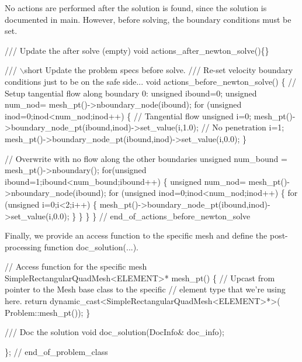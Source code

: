 No actions are performed after the solution is found, since the solution is documented in {\ttfamily main}. However, before solving, the boundary conditions must be set.


\begin{DoxyCodeInclude}
 \textcolor{comment}{/// Update the after solve (empty)}
 \textcolor{keywordtype}{void} actions\_after\_newton\_solve()\{\}

\textcolor{comment}{}
\textcolor{comment}{ /// \(\backslash\)short Update the problem specs before solve. }
\textcolor{comment}{ /// Re-set velocity boundary conditions just to be on the safe side...}
\textcolor{comment}{} \textcolor{keywordtype}{void} actions\_before\_newton\_solve()
 \{
  \textcolor{comment}{// Setup tangential flow along boundary 0:}
  \textcolor{keywordtype}{unsigned} ibound=0; 
  \textcolor{keywordtype}{unsigned} num\_nod= mesh\_pt()->nboundary\_node(ibound);
  \textcolor{keywordflow}{for} (\textcolor{keywordtype}{unsigned} inod=0;inod<num\_nod;inod++)
   \{
    \textcolor{comment}{// Tangential flow}
    \textcolor{keywordtype}{unsigned} i=0;
    mesh\_pt()->boundary\_node\_pt(ibound,inod)->set\_value(i,1.0);
    \textcolor{comment}{// No penetration}
    i=1;
    mesh\_pt()->boundary\_node\_pt(ibound,inod)->set\_value(i,0.0);
   \}
  
  \textcolor{comment}{// Overwrite with no flow along the other boundaries}
  \textcolor{keywordtype}{unsigned} num\_bound = mesh\_pt()->nboundary();
  \textcolor{keywordflow}{for}(\textcolor{keywordtype}{unsigned} ibound=1;ibound<num\_bound;ibound++)
   \{
    \textcolor{keywordtype}{unsigned} num\_nod= mesh\_pt()->nboundary\_node(ibound);
    \textcolor{keywordflow}{for} (\textcolor{keywordtype}{unsigned} inod=0;inod<num\_nod;inod++)
     \{
      \textcolor{keywordflow}{for} (\textcolor{keywordtype}{unsigned} i=0;i<2;i++)
       \{
        mesh\_pt()->boundary\_node\_pt(ibound,inod)->set\_value(i,0.0);
       \}
     \}
   \}
 \} \textcolor{comment}{// end\_of\_actions\_before\_newton\_solve}

\end{DoxyCodeInclude}


Finally, we provide an access function to the specific mesh and define the post-\/processing function {\ttfamily doc\+\_\+solution}(...).


\begin{DoxyCodeInclude}
 \textcolor{comment}{// Access function for the specific mesh}
 SimpleRectangularQuadMesh<ELEMENT>* mesh\_pt() 
  \{
   \textcolor{comment}{// Upcast from pointer to the Mesh base class to the specific }
   \textcolor{comment}{// element type that we're using here.}
   \textcolor{keywordflow}{return} \textcolor{keyword}{dynamic\_cast<}SimpleRectangularQuadMesh<ELEMENT>*\textcolor{keyword}{>}(
    Problem::mesh\_pt());
  \}

\textcolor{comment}{}
\textcolor{comment}{ /// Doc the solution}
\textcolor{comment}{} \textcolor{keywordtype}{void} doc\_solution(DocInfo& doc\_info);

\}; \textcolor{comment}{// end\_of\_problem\_class}

\end{DoxyCodeInclude}




